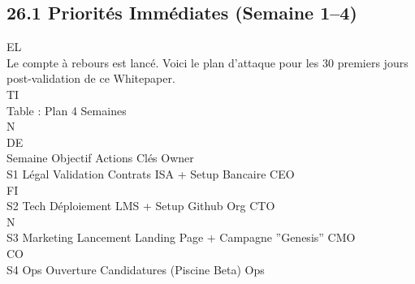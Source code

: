 \subsection{26.1 Priorités Immédiates (Semaine 1–4)}
\vspace{0.5em}
\vspace{0.5em}
\vspace{0.5em}
\vspace{0.5em}
EL\\
Le compte à rebours est lancé. Voici le plan d’attaque pour les 30 premiers jours post-validation de ce Whitepaper.\\
\vspace{0.5em}
\vspace{0.5em}
\vspace{0.5em}
\vspace{0.5em}
TI\\
Table : Plan 4 Semaines\\
\vspace{0.5em}
\vspace{0.5em}
\vspace{0.5em}
\vspace{0.5em}
N\\
DE\\
Semaine Objectif Actions Clés                                 Owner\\
S1      Légal     Validation Contrats ISA + Setup Bancaire    CEO\\
\vspace{0.5em}
\vspace{0.5em}
\vspace{0.5em}
\vspace{0.5em}
FI\\
S2      Tech      Déploiement LMS + Setup Github Org          CTO\\
\vspace{0.5em}
\vspace{0.5em}
N\\
S3      Marketing Lancement Landing Page + Campagne ”Genesis” CMO\\
CO\\
S4      Ops       Ouverture Candidatures (Piscine Beta)       Ops\\
\vspace{0.5em}
\vspace{0.5em}
\vspace{0.5em}
